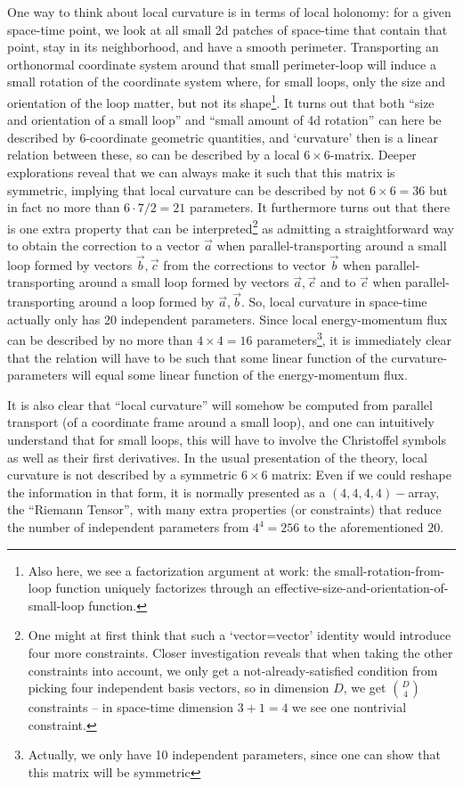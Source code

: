 \documentclass[twocolumn]{article}
\begin{document}
One way to think about local curvature is in terms of local holonomy:
for a given space-time point, we look at all small 2d patches of
space-time that contain that point, stay in its neighborhood, and have
a smooth perimeter. Transporting an orthonormal coordinate system
around that small perimeter-loop will induce a small rotation of the
coordinate system where, for small loops, only the size and
orientation of the loop matter, but not its shape\footnote{Also here,
we see a factorization argument at work: the small-rotation-from-loop
function uniquely factorizes through an
effective-size-and-orientation-of-small-loop function.}.  It turns out
that both ``size and orientation of a small loop'' and ``small amount
of 4d rotation'' can here be described by 6-coordinate geometric
quantities, and `curvature' then is a linear relation between these,
so can be described by a local $6\times 6$-matrix. Deeper explorations
reveal that we can always make it such that this matrix is symmetric,
implying that local curvature can be described by not $6\times 6=36$
but in fact no more than $6\cdot 7/2=21$ parameters. It furthermore
turns out that there is one extra property that can be
interpreted\footnote{ One might at first think that such a
`vector=vector' identity would introduce four more constraints. Closer
investigation reveals that when taking the other constraints into
account, we only get a not-already-satisfied condition from picking
four independent basis vectors, so in dimension $D$, we get
$\binom{D}{4}$ constraints -- in space-time dimension $3+1=4$ we see
one nontrivial constraint.}  as admitting a straightforward way to
obtain the correction to a vector $\vec a$ when parallel-transporting
around a small loop formed by vectors $\vec b, \vec c$ from the
corrections to vector $\vec b$ when parallel-transporting around a
small loop formed by vectors $\vec a, \vec c$ and to $\vec c$ when
parallel-transporting around a loop formed by $\vec a,\vec b$.  So,
local curvature in space-time actually only has 20 independent
parameters. Since local energy-momentum flux can be described by no
more than $4\times 4=16$ parameters\footnote{Actually, we only have 10
independent parameters, since one can show that this matrix will be
symmetric}, it is immediately clear that the relation will have to be
such that some linear function of the curvature-parameters will equal
some linear function of the energy-momentum flux.

It is also clear that ``local curvature'' will somehow be computed
from parallel transport (of a coordinate frame around a small loop),
and one can intuitively understand that for small loops, this will
have to involve the Christoffel symbols as well as their first
derivatives. In the usual presentation of the theory, local curvature
is not described by a symmetric $6\times 6$ matrix: Even if we could
reshape the information in that form, it is normally presented as a
$(4,4,4,4)-$array, the ``Riemann Tensor'', with many extra properties
(or constraints) that reduce the number of independent parameters from
$4^4=256$ to the aforementioned $20$.
\end{document}
